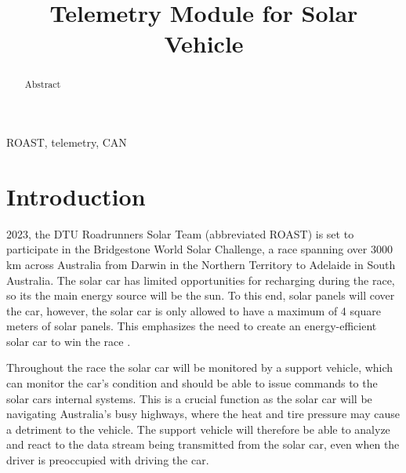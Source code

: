 \documentclass[conference]{IEEEtran}
\begin{document}
\title{Telemetry Module for Solar Vehicle}

\author{
}

\maketitle

\begin{abstract}
Abstract
\end{abstract}

\begin{IEEEkeywords}
ROAST, telemetry, CAN
\end{IEEEkeywords}



\section{Introduction}

 2023, the DTU Roadrunners Solar Team (abbreviated ROAST) is set to participate in the Bridgestone World Solar Challenge, a race spanning over 3000 km across Australia from Darwin in the Northern Territory to Adelaide in South Australia. The solar car has limited opportunities for recharging during the race, so its the main energy source will be the sun. To this end, solar panels will cover the car, however, the solar car is only allowed to have a maximum of 4 square meters of solar panels. This emphasizes the need to create an energy-efficient solar car to win the race \cite{wsc}.

Throughout the race the solar car will be monitored by a support vehicle, which can monitor the car's condition and should be able to issue commands to the solar cars internal systems. This is a crucial function as the solar car will be navigating Australia's busy highways, where the heat and tire pressure may cause a detriment to the vehicle. The support vehicle will therefore be able to analyze and react to the data stream being transmitted from the solar car, even when the driver is preoccupied with driving the car. 
\end{document}
